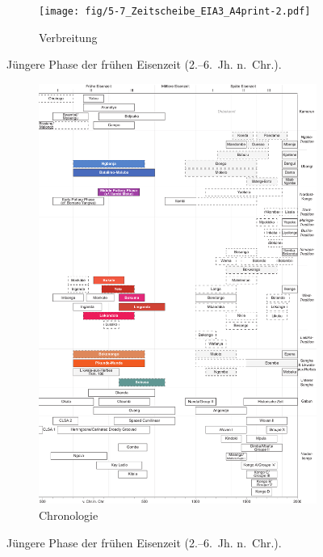 \begin{figure}[p]
	\centering
	\begin{subfigure}[b]{\textwidth}
		\centering
		\texttt{[image: fig/5-7\_Zeitscheibe\_EIA3\_A4print-2.pdf]}
		\vspace{4cm}
		\caption{Verbreitung}
		\label{fig:EIA3_Karte}
	\end{subfigure}
	\caption{Jüngere Phase der frühen Eisenzeit (2.--6.~Jh. n.~Chr.).}
	\label{}
\end{figure}
\addtocounter{figure}{-1}
\begin{figure}[p]
	\begin{subfigure}[b]{\textwidth}
		\setcounter{subfigure}{1}
		\centering
		\includegraphics[height = .9\textheight]{fig/Chronologiesystem_v4_Zeitscheibe_EIA3.pdf}
		\caption{Chronologie}
		\label{fig:EIA3_Chronologie}
	\end{subfigure}
	\caption{Jüngere Phase der frühen Eisenzeit (2.--6.~Jh. n.~Chr.).}
	\label{fig:EIA3}
\end{figure}

